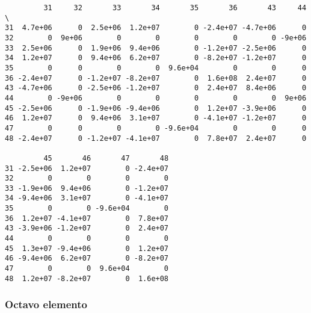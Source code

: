 \documentclass{article}
\begin{document}
    
    \begin{verbatim}
         31     32       33       34       35       36       43     44  \
31  4.7e+06      0  2.5e+06  1.2e+07        0 -2.4e+07 -4.7e+06      0   
32        0  9e+06        0        0        0        0        0 -9e+06   
33  2.5e+06      0  1.9e+06  9.4e+06        0 -1.2e+07 -2.5e+06      0   
34  1.2e+07      0  9.4e+06  6.2e+07        0 -8.2e+07 -1.2e+07      0   
35        0      0        0        0  9.6e+04        0        0      0   
36 -2.4e+07      0 -1.2e+07 -8.2e+07        0  1.6e+08  2.4e+07      0   
43 -4.7e+06      0 -2.5e+06 -1.2e+07        0  2.4e+07  8.4e+06      0   
44        0 -9e+06        0        0        0        0        0  9e+06   
45 -2.5e+06      0 -1.9e+06 -9.4e+06        0  1.2e+07 -3.9e+06      0   
46  1.2e+07      0  9.4e+06  3.1e+07        0 -4.1e+07 -1.2e+07      0   
47        0      0        0        0 -9.6e+04        0        0      0   
48 -2.4e+07      0 -1.2e+07 -4.1e+07        0  7.8e+07  2.4e+07      0   

         45       46       47       48  
31 -2.5e+06  1.2e+07        0 -2.4e+07  
32        0        0        0        0  
33 -1.9e+06  9.4e+06        0 -1.2e+07  
34 -9.4e+06  3.1e+07        0 -4.1e+07  
35        0        0 -9.6e+04        0  
36  1.2e+07 -4.1e+07        0  7.8e+07  
43 -3.9e+06 -1.2e+07        0  2.4e+07  
44        0        0        0        0  
45  1.3e+07 -9.4e+06        0  1.2e+07  
46 -9.4e+06  6.2e+07        0 -8.2e+07  
47        0        0  9.6e+04        0  
48  1.2e+07 -8.2e+07        0  1.6e+08  
    \end{verbatim}

    
    \subsubsection{Octavo elemento}\label{octavo-elemento}
\end{document}
